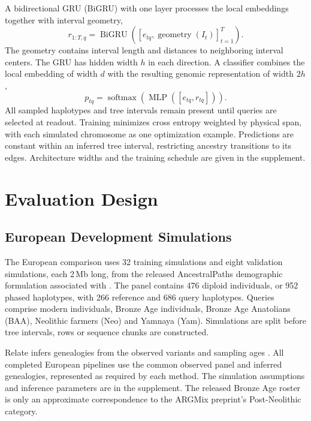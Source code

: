\documentclass[letterpaper]{article}
\begin{document}
A bidirectional GRU (BiGRU) with one layer processes the local embeddings together with interval geometry,
\begin{equation}
r_{1:T,q}=\operatorname{BiGRU}
\left([e_{tq},\operatorname{geometry}(I_t)]_{t=1}^T\right).
\end{equation}
The geometry contains interval length and distances to neighboring interval centers. The GRU has hidden width $h$ in each direction. A classifier combines the local embedding of width $d$ with the resulting genomic representation of width $2h$,
\begin{equation}
p_{tq}=\operatorname{softmax}
\left(\operatorname{MLP}([e_{tq},r_{tq}])\right).
\end{equation}
All sampled haplotypes and tree intervals remain present until queries are selected at readout. Training minimizes cross entropy weighted by physical span, with each simulated chromosome as one optimization example. Predictions are constant within an inferred tree interval, restricting ancestry transitions to its edges. Architecture widths and the training schedule are given in the supplement.

\section{Evaluation Design}
\subsection{European Development Simulations}
The European comparison uses 32 training simulations and eight validation simulations, each 2\,Mb long, from the released AncestralPaths demographic formulation associated with \citet{eurasians2024}. The panel contains 476 diploid individuals, or 952 phased haplotypes, with 266 reference and 686 query haplotypes. Queries comprise modern individuals, Bronze Age individuals, Bronze Age Anatolians (BAA), Neolithic farmers (Neo) and Yamnaya (Yam). Simulations are split before tree intervals, rows or sequence chunks are constructed.

Relate infers genealogies from the observed variants and sampling ages \citep{relate2019}. All completed European pipelines use the common observed panel and inferred genealogies, represented as required by each method. The simulation assumptions and inference parameters are in the supplement. The released Bronze Age roster is only an approximate correspondence to the ARGMix preprint's Post-Neolithic category.
\end{document}
